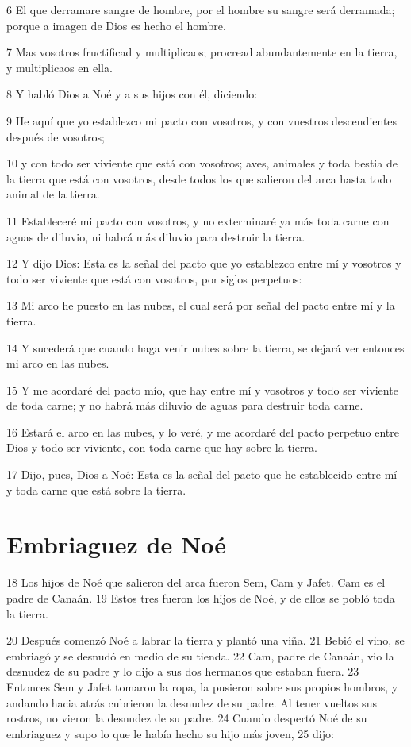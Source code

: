 6 El que derramare sangre de hombre, por el hombre su sangre será derramada; porque a imagen de Dios es hecho el hombre.

7 Mas vosotros fructificad y multiplicaos; procread abundantemente en la tierra, y multiplicaos en ella.

8 Y habló Dios a Noé y a sus hijos con él, diciendo:

9 He aquí que yo establezco mi pacto con vosotros, y con vuestros descendientes después de vosotros;

10 y con todo ser viviente que está con vosotros; aves, animales y toda bestia de la tierra que está con vosotros, desde todos los que salieron del arca hasta todo animal de la tierra.

11 Estableceré mi pacto con vosotros, y no exterminaré ya más toda carne con aguas de diluvio, ni habrá más diluvio para destruir la tierra.

12 Y dijo Dios: Esta es la señal del pacto que yo establezco entre mí y vosotros y todo ser viviente que está con vosotros, por siglos perpetuos:

13 Mi arco he puesto en las nubes, el cual será por señal del pacto entre mí y la tierra.

14 Y sucederá que cuando haga venir nubes sobre la tierra, se dejará ver entonces mi arco en las nubes.

15 Y me acordaré del pacto mío, que hay entre mí y vosotros y todo ser viviente de toda carne; y no habrá más diluvio de aguas para destruir toda carne.

16 Estará el arco en las nubes, y lo veré, y me acordaré del pacto perpetuo entre Dios y todo ser viviente, con toda carne que hay sobre la tierra.

17 Dijo, pues, Dios a Noé: Esta es la señal del pacto que he establecido entre mí y toda carne que está sobre la tierra.

\section{Embriaguez de Noé}

18 Los hijos de Noé que salieron del arca fueron Sem, Cam y Jafet. Cam es el padre de Canaán. 19 Estos tres fueron los hijos de Noé, y de ellos se pobló toda la tierra.

20 Después comenzó Noé a labrar la tierra y plantó una viña. 21 Bebió el vino, se embriagó y se desnudó en medio de su tienda. 22 Cam, padre de Canaán, vio la desnudez de su padre y lo dijo a sus dos hermanos que estaban fuera. 23 Entonces Sem y Jafet tomaron la ropa, la pusieron sobre sus propios hombros, y andando hacia atrás cubrieron la desnudez de su padre. Al tener vueltos sus rostros, no vieron la desnudez de su padre. 24 Cuando despertó Noé de su embriaguez y supo lo que le había hecho su hijo más joven, 25 dijo:

